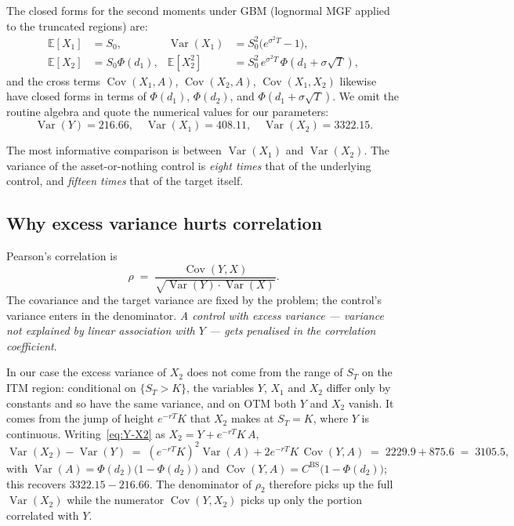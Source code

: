 \documentclass[11pt,a4paper]{article}
\theoremstyle{plain}
\theoremstyle{definition}
\theoremstyle{remark}
\newcommand{\E}{\mathbb{E}}
\newcommand{\Var}{\operatorname{Var}}
\newcommand{\Cov}{\operatorname{Cov}}
\begin{document}
The closed forms for the second moments under GBM (lognormal MGF
applied to the truncated regions) are:
\begin{align}
\E[X_1] &= S_0, & \Var(X_1) &= S_0^2 \bigl(e^{\sigma^2 T} - 1\bigr), \\
\E[X_2] &= S_0 \Phi(d_1), &
\E[X_2^2] &= S_0^2 \, e^{\sigma^2 T} \, \Phi(d_1 + \sigma\sqrt T),
\end{align}
and the cross terms $\Cov(X_1, A)$, $\Cov(X_2, A)$, $\Cov(X_1, X_2)$
likewise have closed forms in terms of $\Phi(d_1)$, $\Phi(d_2)$, and
$\Phi(d_1 + \sigma \sqrt T)$. We omit the routine algebra and quote
the numerical values for our parameters:
\begin{equation}
\Var(Y) = 216.66, \quad \Var(X_1) = 408.11, \quad \Var(X_2) = 3322.15.
\end{equation}

The most informative comparison is between $\Var(X_1)$ and
$\Var(X_2)$. The variance of the asset-or-nothing control is
\emph{eight times} that of the underlying control, and \emph{fifteen
times} that of the target itself.

\subsection{Why excess variance hurts correlation}

Pearson's correlation is
\begin{equation}
\rho \;=\; \frac{\Cov(Y, X)}{\sqrt{\Var(Y) \cdot \Var(X)}}.
\end{equation}
The covariance and the target variance are fixed by the problem; the
control's variance enters in the denominator. \emph{A control with
excess variance --- variance not explained by linear association
with $Y$ --- gets penalised in the correlation coefficient}.

In our case the excess variance of $X_2$ does not come from the
range of $S_T$ on the ITM region: conditional on $\{S_T > K\}$, the
variables $Y$, $X_1$ and $X_2$ differ only by constants and so have
the same variance, and on OTM both $Y$ and $X_2$ vanish. It comes
from the jump of height $e^{-rT} K$ that $X_2$ makes at $S_T = K$,
where $Y$ is continuous. Writing~\eqref{eq:Y-X2} as $X_2 = Y +
e^{-rT} K \, A$,
\begin{equation}
\Var(X_2) - \Var(Y) \;=\; (e^{-rT} K)^2 \Var(A)
+ 2 e^{-rT} K \,\Cov(Y, A) \;=\; 2229.9 + 875.6 \;=\; 3105.5,
\end{equation}
with $\Var(A) = \Phi(d_2)\bigl(1 - \Phi(d_2)\bigr)$ and $\Cov(Y, A)
= C^{\mathrm{BS}} \bigl(1 - \Phi(d_2)\bigr)$; this recovers
$3322.15 - 216.66$. The denominator of $\rho_2$ therefore picks up
the full $\Var(X_2)$ while the numerator $\Cov(Y, X_2)$ picks up
only the portion correlated with $Y$.
\end{document}
